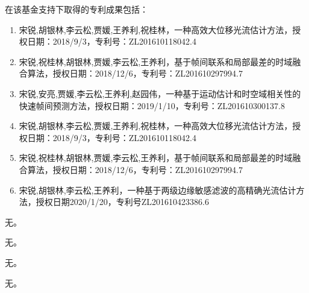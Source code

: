 \documentclass[12pt]{article}
\begin{document}
在该基金支持下取得的专利成果包括：
\begin{enumerate}
    \item 宋锐,胡银林,李云松,贾媛,王养利,祝桂林，一种高效大位移光流估计方法，授权日期：2018/9/3，专利号：ZL201610118042.4
    \item 宋锐,祝桂林,胡银林,贾媛,李云松,王养利，基于帧间联系和局部最差的时域融合算法，授权日期：2018/12/6，专利号：ZL201610297994.7
    \item 宋锐,安亮,贾媛,李云松,王养利,赵园伟，一种基于运动估计和时空域相关性的快速帧间预测方法，授权日期：2019/1/10，专利号：ZL201610300137.8
    \item 宋锐,胡银林,李云松,贾媛,王养利,祝桂林，一种高效大位移光流估计方法，授权日期：2018/9/3，专利号：ZL201610118042.4
    \item 宋锐,祝桂林,胡银林,贾媛,李云松,王养利，基于帧间联系和局部最差的时域融合算法，授权日期：2018/12/6，专利号：ZL201610297994.7
    \item 宋锐,胡银林,李云松,王养利，一种基于两级边缘敏感滤波的高精确光流估计方法，授权日期2020/1/20，专利号ZL201610423386.6
\end{enumerate}



无。


无。


无。


无。
\end{document}
